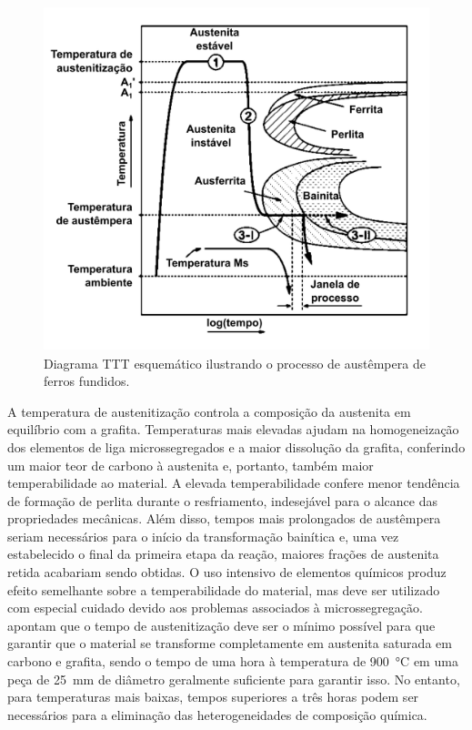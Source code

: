 \begin{figure}
  \includegraphics[height=10cm]{img/austemperaTTT_Meier.pdf}
  \caption{Diagrama TTT esquemático ilustrando o processo de austêmpera de ferros fundidos\cite{Meier2013a}.}
  \label{fig:austemperaMeier}
\end{figure}

A temperatura de austenitização controla a composição da austenita em equilíbrio com a grafita. Temperaturas mais elevadas ajudam na homogeneização dos elementos de liga microssegregados e a maior dissolução da grafita, conferindo um maior teor de carbono à austenita e, portanto, também maior temperabilidade ao material. A elevada temperabilidade confere menor tendência de formação de perlita durante o resfriamento, indesejável para o alcance das propriedades mecânicas\cite{Trudel1997}. Além disso, tempos mais prolongados de austêmpera seriam necessários para o início da transformação bainítica e, uma vez estabelecido o final da primeira etapa da reação, maiores frações de austenita retida acabariam sendo obtidas. O uso intensivo de elementos químicos produz efeito semelhante sobre a temperabilidade do material, mas deve ser utilizado com especial cuidado devido aos problemas associados à microssegregação\cite{Bayati1995,Velez1996}.  apontam que o tempo de austenitização deve ser o mínimo possível para que garantir que o material se transforme completamente em austenita saturada em carbono e grafita, sendo o tempo de uma hora à temperatura de \SI{900}{\degreeCelsius} em uma peça de \SI{25}{mm} de diâmetro geralmente suficiente para garantir isso. No entanto, para temperaturas mais baixas, tempos superiores a três horas podem ser necessários para a eliminação das heterogeneidades de composição química.

